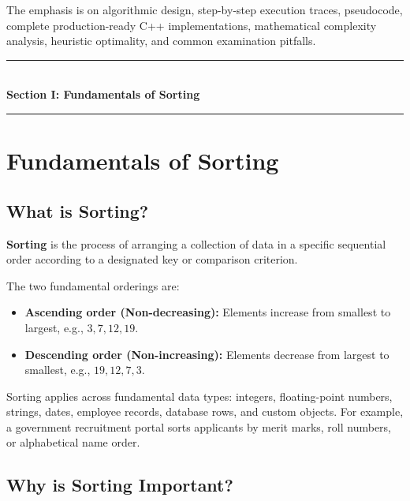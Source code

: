 The emphasis is on algorithmic design, step-by-step execution traces, pseudocode, complete production-ready C++ implementations, mathematical complexity analysis, heuristic optimality, and common examination pitfalls.

\begin{center}
\vspace{0.5em}
{\color{primary}\rule{0.45\textwidth}{1.2pt}}\\[4pt]
{\Large\bfseries\color{primary} Section I: Fundamentals of Sorting}\\[2pt]
{\color{primary}\rule{0.45\textwidth}{1.2pt}}
\vspace{0.5em}
\end{center}

\section{Fundamentals of Sorting}

\subsection{What is Sorting?}

\textbf{Sorting} is the process of arranging a collection of data in a specific sequential order according to a designated key or comparison criterion.

The two fundamental orderings are:
\begin{itemize}
    \item \textbf{Ascending order (Non-decreasing):} Elements increase from smallest to largest, e.g., $3, 7, 12, 19$.
    \item \textbf{Descending order (Non-increasing):} Elements decrease from largest to smallest, e.g., $19, 12, 7, 3$.
\end{itemize}

Sorting applies across fundamental data types: integers, floating-point numbers, strings, dates, employee records, database rows, and custom objects. For example, a government recruitment portal sorts applicants by merit marks, roll numbers, or alphabetical name order.

\subsection{Why is Sorting Important?}

